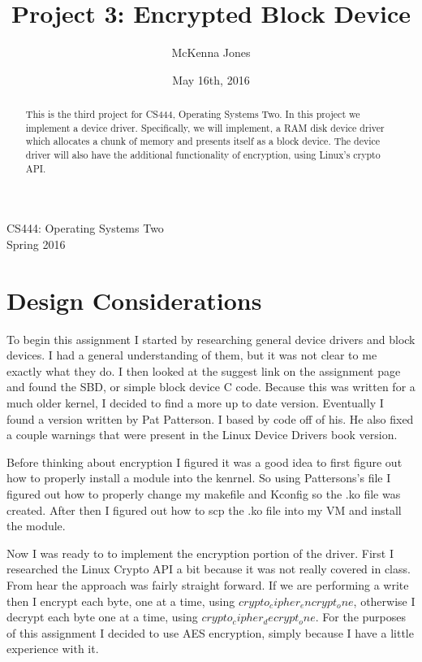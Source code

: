 \documentclass[letterpaper,10pt,titlepage,draftclsnofoot,onecolumn]{IEEEtran}
\title{Project 3: Encrypted Block Device}
\author{McKenna Jones}
\date{May 16th, 2016}
\begin{document}
\begin{titlepage}

\maketitle
\begin{center}
CS444: Operating Systems Two \\
Spring 2016
\vspace{50 mm}
\end{center}
\begin{abstract}
This is the third project for CS444, Operating Systems Two. In this project we implement a device driver. Specifically, we will implement, a RAM disk device driver which allocates a chunk of memory and presents itself as a block device. The device driver will also have the additional functionality of encryption, using Linux's crypto API.
\end{abstract}
\end{titlepage}
\section{Design Considerations}
To begin this assignment I started by researching general device drivers and block devices. I had a general understanding of them, but it was not clear to me exactly what they do. I then looked at the suggest link on the assignment page and found the SBD, or simple block device C code. Because this was written for a much older kernel, I decided to find a more up to date version. Eventually I found a version written by Pat Patterson. \cite{pat} I based by code off of his. He also fixed a couple warnings that were present in the Linux Device Drivers book version.

Before thinking about encryption I figured it was a good idea to first figure out how to properly install a module into the kenrnel. So using Pattersons's file I figured out how to properly change my makefile and Kconfig so the .ko file was created. After then I figured out how to scp the .ko file into my VM and install the module. 

Now I was ready to to implement the encryption portion of the driver. First I researched the Linux Crypto API a bit because it was not really covered in class. From hear the approach was fairly straight forward. If we are performing a write then I encrypt each byte, one at a time, using $crypto_cipher_encrypt_one$, otherwise I decrypt each byte one at a time, using $crypto_cipher_decrypt_one$. For the purposes of this assignment I decided to use AES encryption, simply because I have a little experience with it. 
\end{document}
